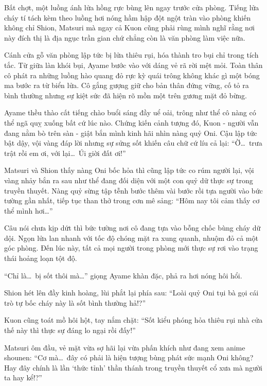\documentclass[../main.tex]{subfiles}
\begin{document}
Bất chợt, một luồng ánh lửa hồng rực bùng lên ngay trước cửa phòng. Tiếng lửa cháy tí tách kèm theo luồng hơi nóng hầm hập đột ngột tràn vào phòng khiến không chỉ Shion, Matsuri mà ngay cả Kuon cũng phải rùng mình nghĩ rằng nơi này đích thị là địa ngục trần gian chứ chẳng còn là văn phòng làm việc nữa.

Cánh cửa gỗ văn phòng lập tức bị lửa thiêu rụi, hóa thành tro bụi chỉ trong tích tắc. Từ giữa làn khói bụi, Ayame bước vào với dáng vẻ rã rời mệt mỏi. Toàn thân cô phát ra những luồng hào quang đỏ rực kỳ quái trông không khác gì một bóng ma bước ra từ biển lửa. Cô gắng gượng giữ cho bản thân đứng vững, cố tỏ ra bình thường nhưng sự kiệt sức đã hiện rõ mồn một trên gương mặt đỏ bừng.


Ayame thều thào cất tiếng chào buổi sáng đầy uể oải, trông như thể cô nàng có thể ngã quỵ xuống bất cứ lúc nào. Chứng kiến cảnh tượng đó, Kuon - người vẫn đang nằm bò trên sàn - giật bắn mình kinh hãi nhìn nàng quỷ Oni. Cậu lập tức bật dậy, vội vàng đáp lời nhưng sự sửng sốt khiến câu chữ cứ líu cả lại: ``Ờ\dots\ trưa trật rồi em ơi, với lại\dots\ Úi giời đất ơi!''

Matsuri và Shion thấy nàng Oni bốc hỏa thì cũng lập tức co rúm người lại, vội vàng nhảy bắn ra sau như thể đang đối diện với một con quỷ dữ thực sự trong truyền thuyết. Nàng quỷ sừng tập tễnh bước thêm vài bước rồi tựa người vào bức tường gần nhất, tiếp tục than thở trong cơn mê sảng: ``Hôm nay tôi cảm thấy cơ thể mình hơi\dots''

Câu nói chưa kịp dứt thì bức tường nơi cô đang tựa vào bỗng chốc bùng cháy dữ dội. Ngọn lửa lan nhanh với tốc độ chóng mặt ra xung quanh, nhuộm đỏ cả một góc phòng. Đến lúc này, tất cả mọi người trong phòng mới thực sự rơi vào trạng thái hoảng loạn tột độ.

``Chỉ là\dots\ bị sốt thôi mà\dots'' giọng Ayame khàn đặc, phả ra hơi nóng hôi hổi.

Shion hét lên đầy kinh hoàng, lùi phắt lại phía sau: ``Loài quỷ Oni tụi bà gọi cái trò tự bốc cháy này là sốt bình thường hả!?''

Kuon cũng toát mồ hôi hột, tay nắm chặt: ``Sốt kiểu phóng hỏa thiêu rụi nhà cửa thế này thì thực sự đáng lo ngại rồi đấy!''

Matsuri ôm đầu, vẻ mặt vừa sợ hãi lại vừa phấn khích như đang xem anime shounen: ``Cơ mà\dots\ đây có phải là hiện tượng bùng phát sức mạnh Oni không? Hay đây chính là lần `thức tỉnh' thần thánh trong truyền thuyết cổ xưa mà người ta hay kể!?''
\end{document}
